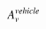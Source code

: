 

    \[\let\par\empty

    
{{{{\miitalic{A}}}\sb{{\miitalic{v}}}\sp{{\miitalic{vehicle}}}}}


    \]

  